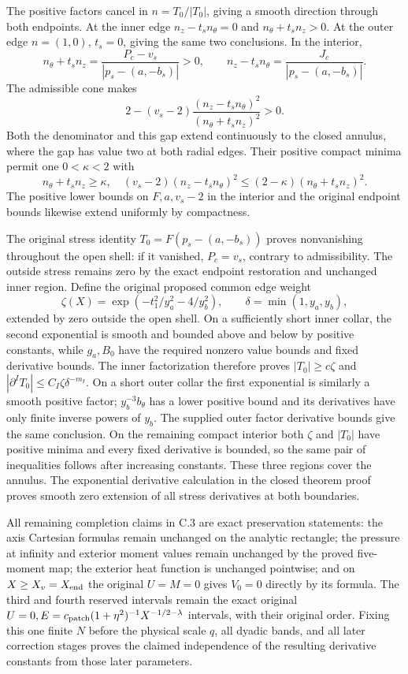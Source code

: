 \documentclass[10pt,a4paper]{article}
\begin{document}
The positive factors cancel in \(n=T_0/|T_0|\), giving a smooth direction through both endpoints. At the inner edge \(n_z-t_sn_\theta=0\) and \(n_\theta+t_sn_z>0\). At the outer edge \(n=(1,0)\), \(t_s=0\), giving the same two conclusions. In the interior, \[
n_\theta+t_sn_z=\frac{P_c-v_s}{|p_s-(a,-b_s)|}>0,\qquad
n_z-t_sn_\theta=\frac{J_c}{|p_s-(a,-b_s)|}.
\] The admissible cone makes \[
2-(v_s-2)\frac{(n_z-t_sn_\theta)^2}{(n_\theta+t_sn_z)^2}>0.
\] Both the denominator and this gap extend continuously to the closed annulus, where the gap has value two at both radial edges. Their positive compact minima permit one \(0<\kappa<2\) with \[
n_\theta+t_sn_z\ge\kappa,\quad
(v_s-2)(n_z-t_sn_\theta)^2
\le(2-\kappa)(n_\theta+t_sn_z)^2.
\] The positive lower bounds on \(F,a,v_s-2\) in the interior and the original endpoint bounds likewise extend uniformly by compactness.

The original stress identity \(T_0=F(p_s-(a,-b_s))\) proves nonvanishing throughout the open shell: if it vanished, \(P_c=v_s\), contrary to admissibility. The outside stress remains zero by the exact endpoint restoration and unchanged inner region. Define the original proposed common edge weight \[
\zeta(X)=\exp(-t_1^2/y_a^2-4/y_b^2),\qquad
\delta=\min(1,y_a,y_b),
\] extended by zero outside the open shell. On a sufficiently short inner collar, the second exponential is smooth and bounded above and below by positive constants, while \(g_a,B_0\) have the required nonzero value bounds and fixed derivative bounds. The inner factorization therefore proves \(|T_0|\ge c\zeta\) and \(|\partial^IT_0|\le C_I\zeta\delta^{-m_I}\). On a short outer collar the first exponential is similarly a smooth positive factor; \(y_b^{-3}b_\theta\) has a lower positive bound and its derivatives have only finite inverse powers of \(y_b\). The supplied outer factor derivative bounds give the same conclusion. On the remaining compact interior both \(\zeta\) and \(|T_0|\) have positive minima and every fixed derivative is bounded, so the same pair of inequalities follows after increasing constants. These three regions cover the annulus. The exponential derivative calculation in the closed theorem proof proves smooth zero extension of all stress derivatives at both boundaries.

All remaining completion claims in C.3 are exact preservation statements: the axis Cartesian formulas remain unchanged on the analytic rectangle; the pressure at infinity and exterior moment values remain unchanged by the proved five-moment map; the exterior heat function is unchanged pointwise; and on \(X\ge X_v=X_{\rm end}\) the original \(U=M=0\) gives \(V_0=0\) directly by its formula. The third and fourth reserved intervals remain the exact original \(U=0,E=c_{\rm patch}(1+\eta^2)^{-1}X^{-1/2-\lambda}\) intervals, with their original order. Fixing this one finite \(N\) before the physical scale \(q\), all dyadic bands, and all later correction stages proves the claimed independence of the resulting derivative constants from those later parameters.
\end{document}
